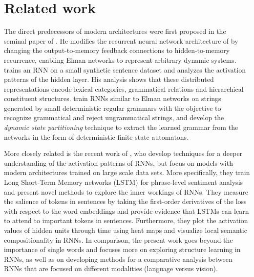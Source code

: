 \section{Related work}
\label{sec:related}

The direct predecessors of modern architectures were first proposed in the
seminal paper of \citep{elman1990finding}. He modifies the recurrent
neural network architecture of \citep{jordan1986attractor} by changing the output-to-memory
feedback connections to hidden-to-memory recurrence, enabling Elman networks to
represent arbitrary dynamic systems. \citep{elman1991distributed} trains an RNN on a small synthetic
sentence  dataset and analyzes the activation patterns of the hidden
layer. His analysis shows that these distributed representations
encode lexical categories, grammatical relations and hierarchical constituent
structures. \citep{giles1992extracting} train RNNs similar to Elman
networks on strings generated by small
deterministic regular grammars with the objective to recognize grammatical and reject ungrammatical
strings, and develop the \emph{dynamic state partitioning} technique to extract the learned
grammar from the networks in the form of deterministic finite state
automatons.


More closely related is the recent work of \citep{li2015visualizing}, who develop techniques
for a deeper understanding of the activation patterns of RNNs, but focus on models with
modern architectures trained on large scale data sets. More specifically, they train Long
Short-Term Memory networks (LSTM) \cite{hochreiter1997long}
for phrase-level sentiment analysis
and present novel methods
to explore the inner workings of RNNs. They measure the salience of tokens
in sentences by taking the first-order derivatives of the loss with respect to the
word embeddings and provide evidence
that LSTMs can learn to attend to important tokens in sentences. Furthermore,
they plot the activation values of hidden units through time using heat maps
and visualize local semantic compositionality in RNNs.
In comparison, the present work goes beyond the importance of single words and focuses more on exploring structure
learning in RNNs, as well as on developing methods for a comparative analysis between RNNs that are focused on different modalities (language versus vision).


